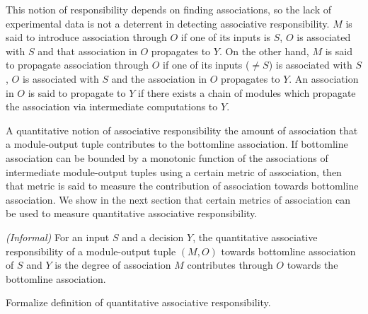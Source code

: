 \documentclass[10pt, onecolumn]{report}
\begin{document}
This notion of responsibility depends on finding associations, so the lack 
of experimental data is not a deterrent in detecting associative responsibility. 
$M$ is said to introduce association through $O$ if one of its inputs is $S$, 
$O$ is associated with $S$ and that association in $O$ propagates to $Y$. 
On the other hand, $M$ is said to propagate association through $O$ if
one of its inputs ($\neq S$) is associated with $S$, $O$
is associated with $S$ and the association in $O$ propagates to $Y$. 
An association in $O$ is said to propagate to $Y$ if there exists a chain of modules
which propagate the association via intermediate computations to $Y$.

A quantitative notion of associative responsibility the amount of association
that a module-output tuple contributes to the bottomline association. 
If bottomline association can be bounded by a monotonic function of the
associations of intermediate module-output tuples using a certain metric of 
association, then that metric is said to measure the contribution of association 
towards bottomline association.
We show in the next section that certain metrics of association can be used to 
measure quantitative associative responsibility.

\begin{definition}\label{def:QAR}\emph{(Informal)}
For an input $S$ and a decision $Y$, the quantitative associative responsibility 
of a module-output tuple $(M, O)$ towards bottomline association of $S$ and $Y$ 
is the degree of association $M$ contributes through $O$ 
towards the bottomline association.
\end{definition}

\begin{task}\label{task:responsibility}
Formalize definition of quantitative associative responsibility. 
\end{task}
\end{document}
